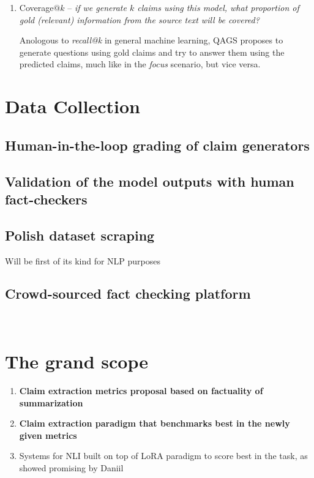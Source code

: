 \begin{enumerate}
    An ellegant and functional perspective on the problem has been brought around in QAGS\footnote{Pronounced \"{kags}, stands for \"{Question Answering and Generation for Summarization}} evaluation protocol~\cite{wang-etal-2020-asking}, where the idea is to use a Question Generation model (QG) to formulate questions in natural language based on all $k$ predicted claims. The questions are then twice answered using a Question Answering (QA) model, giving it knowledge from (i.) the predicted claims (ii.) the gold claims written by a human.
    The focus is then defined as the proportion of questions with the same answers extracted from the gold and predicted claims, among all questions model can generate from the predicted claims. 

    \item {\techbf Coverage}$@k$ -- \textit{if we generate $k$ claims using this model, what proportion of gold (relevant) information from the source text will be covered?}
    
    Anologous to \textit{recall@k} in general machine learning, QAGS proposes to generate questions using gold claims and try to answer them using the predicted claims, much like in the \textit{focus} scenario, but vice versa.
\end{enumerate}

\section{Data Collection}
\subsection{Human-in-the-loop grading of claim generators}
\subsection{Validation of the model outputs with human fact-checkers}
\subsection{Polish dataset scraping}
Will be first of its kind for NLP purposes

\subsection{Crowd-sourced fact checking platform}
~\cite{butora}
\section{The grand scope}
\begin{enumerate}
    \item \textbf{Claim extraction metrics proposal based on factuality of summarization}
    \item \textbf{Claim extraction paradigm that benchmarks best in the newly given metrics}
    \item Systems for NLI built on top of LoRA paradigm to score best in the task, as showed promising by Daniil
    
\end{enumerate}